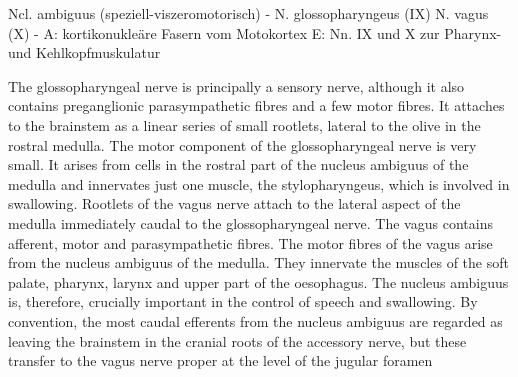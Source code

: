 \documentclass[12pt,a4paper,pdftex]{article}
\begin{document}
Ncl. ambiguus (speziell-viszeromotorisch) - N. glossopharyngeus (IX) N. vagus (X) - A: kortikonukleäre Fasern vom Motokortex E: Nn. IX und X zur Pharynx- und Kehlkopfmuskulatur 

The glossopharyngeal nerve is principally a sensory nerve, although it also contains preganglionic parasympathetic fibres and a few motor fibres. It attaches to the brainstem as a linear series of small rootlets, lateral to the olive in the rostral medulla. The motor component of the glossopharyngeal nerve is very small. It arises from cells in the rostral part of the nucleus ambiguus of the medulla and innervates just one muscle, the stylopharyngeus, which is involved in swallowing.
Rootlets of the vagus nerve attach to the lateral aspect of the medulla immediately caudal to the glossopharyngeal nerve. The vagus contains afferent, motor and parasympathetic fibres. The motor fibres of the vagus arise from the nucleus ambiguus of the medulla. They innervate the muscles of the soft palate, pharynx, larynx and upper part of the oesophagus. The nucleus ambiguus is, therefore, crucially important in the control of speech and swallowing. By
convention, the most caudal efferents from the nucleus ambiguus are regarded as leaving the brainstem in the cranial roots of the accessory nerve, but these transfer to the vagus nerve proper at the level of the jugular foramen
\end{document}
